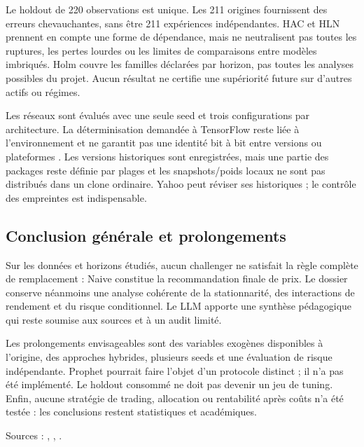 Le holdout de 220 observations est unique. Les 211 origines fournissent des erreurs chevauchantes, sans être 211 expériences indépendantes. HAC et HLN prennent en compte une forme de dépendance, mais ne neutralisent pas toutes les ruptures, les pertes lourdes ou les limites de comparaisons entre modèles imbriqués. Holm couvre les familles déclarées par horizon, pas toutes les analyses possibles du projet. Aucun résultat ne certifie une supériorité future sur d’autres actifs ou régimes.



Les réseaux sont évalués avec une seule seed et trois configurations par architecture. La déterminisation demandée à TensorFlow reste liée à l’environnement et ne garantit pas une identité bit à bit entre versions ou plateformes \cite{R16}. Les versions historiques sont enregistrées, mais une partie des packages reste définie par plages et les snapshots/poids locaux ne sont pas distribués dans un clone ordinaire. Yahoo peut réviser ses historiques ; le contrôle des empreintes est indispensable.





\subsection{Conclusion générale et prolongements}



Sur les données et horizons étudiés, aucun challenger ne satisfait la règle complète de remplacement : Naive constitue la recommandation finale de prix. Le dossier conserve néanmoins une analyse cohérente de la stationnarité, des interactions de rendement et du risque conditionnel. Le LLM apporte une synthèse pédagogique qui reste soumise aux sources et à un audit limité.



Les prolongements envisageables sont des variables exogènes disponibles à l’origine, des approches hybrides, plusieurs seeds et une évaluation de risque indépendante. Prophet pourrait faire l’objet d’un protocole distinct ; il n’a pas été implémenté. Le holdout consommé ne doit pas devenir un jeu de tuning. Enfin, aucune stratégie de trading, allocation ou rentabilité après coûts n’a été testée : les conclusions restent statistiques et académiques.



Sources : , , .

